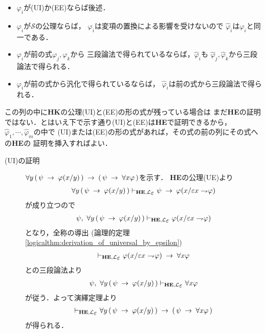 \begin{metaprf}
\begin{description}
\begin{itemize}
					\item $\varphi_{i}$が(UI)か(EE)ならば後述．
					
					\item $\varphi_{i}$が$\mathscr{S}$の公理ならば，
						$\varphi_{i}$は変項の置換による影響を受けないので
						$\hat{\varphi}_{i}$は$\varphi_{i}$と同一である．
					
					\item $\varphi_{i}$が前の式$\varphi_{j},\varphi_{k}$から
						三段論法で得られているならば，$\hat{\varphi}_{i}$も
						$\hat{\varphi}_{j},\hat{\varphi}_{k}$から三段論法で得られる．
					
					\item $\varphi_{i}$が前の式から汎化で得られているならば，
						$\hat{\varphi}_{i}$は前の式から三段論法で得られる．
				\end{itemize}
			
				この列の中に{\bf HK}の公理(UI)と(EE)の形の式が残っている場合は
				まだ{\bf HE}の証明ではない．とはいえ下で示す通り(UI)と(EE)は{\bf HE}で証明できるから，
				$\hat{\varphi}_{1},\cdots,\hat{\varphi}_{m}$の中で
				(UI)または(EE)の形の式があれば，その式の前の列にその式への{\bf HE}の
				証明を挿入すればよい．
				
				\begin{description}
					\item[(UI)の証明]
						$\forall y\, (\, \psi \hspace{0.25em}\rightarrow\hspace{0.25em} \varphi(x/y)\, ) 
						\hspace{0.25em}\rightarrow\hspace{0.25em} (\, \psi \hspace{0.25em}\rightarrow\hspace{0.25em} \forall x \varphi\, )$を示す．
						{\bf HE}の公理(UE)より
						\begin{align}
							\forall y\, (\, \psi \rarrow \varphi(x/y)\, ) \provable{\mbox{{\bf HE}},\lang{\varepsilon}} 
							\psi \rarrow \varphi(x/\varepsilon x \negation \varphi)
						\end{align}
						が成り立つので
						\begin{align}
							\psi,\ \forall y\, (\, \psi \rarrow \varphi(x/y)\, ) \provable{\mbox{{\bf HE}},\lang{\varepsilon}} 
							\varphi(x/\varepsilon x \negation \varphi)
						\end{align}
						となり，全称の導出
						(論理的定理\ref{logicalthm:derivation_of_universal_by_epsilon})
						\begin{align}
							\provable{\mbox{{\bf HE}},\lang{\varepsilon}} \varphi(x/\varepsilon x \negation \varphi)
							\rarrow \forall x \varphi
						\end{align}
						との三段論法より
						\begin{align}
							\psi,\ \forall y\, (\, \psi \rarrow \varphi(x/y)\, ) \provable{\mbox{{\bf HE}},\lang{\varepsilon}}
							\forall x \varphi
						\end{align}
						が従う．よって演繹定理より
						\begin{align}
							\provable{\mbox{{\bf HE}},\lang{\varepsilon}} \forall y\, (\, \psi \rarrow \varphi(x/y)\, )
							\rarrow (\, \psi \rarrow \forall x \varphi\, )
						\end{align}
						が得られる．
					

\end{description}
\end{description}
\end{metaprf}
